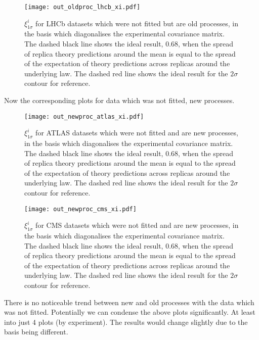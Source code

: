 \begin{figure}[ht]
    \centering
    \texttt{[image: out\_oldproc\_lhcb\_xi.pdf]}
    \caption{$\xi_{1\sigma}^{i}$ for LHCb datasets which were not fitted
    but are old processes, in the basis which diagonalises the experimental
    covariance matrix. The dashed black line shows the ideal result, 0.68, when
    the spread of replica theory predictions around the mean is equal to the
    spread of the expectation of theory predictions across replicas around the
    underlying law. The dashed red line shows the ideal result for the $2\sigma$
    contour for reference.}
    \label{fig:outoldlhcbxi}
\end{figure}

Now the corresponding plots for data which was not fitted, new processes.

\begin{figure}[ht]
    \centering
    \texttt{[image: out\_newproc\_atlas\_xi.pdf]}
    \caption{$\xi_{1\sigma}^{i}$ for ATLAS datasets which were not fitted
    and are new processes, in the basis which diagonalises the experimental
    covariance matrix. The dashed black line shows the ideal result, 0.68, when
    the spread of replica theory predictions around the mean is equal to the
    spread of the expectation of theory predictions across replicas around the
    underlying law. The dashed red line shows the ideal result for the $2\sigma$
    contour for reference.}
    \label{fig:outnewatlasxi}
\end{figure}

\begin{figure}[ht]
    \centering
    \texttt{[image: out\_newproc\_cms\_xi.pdf]}
    \caption{$\xi_{1\sigma}^{i}$ for CMS datasets which were not fitted
    and are new processes, in the basis which diagonalises the experimental
    covariance matrix. The dashed black line shows the ideal result, 0.68, when
    the spread of replica theory predictions around the mean is equal to the
    spread of the expectation of theory predictions across replicas around the
    underlying law. The dashed red line shows the ideal result for the $2\sigma$
    contour for reference.}
    \label{fig:outnewcmsxi}
\end{figure}

There is no noticeable trend between new and old processes with the data which
was not fitted. Potentially we can condense the above plots significantly. At
least into just 4 plots (by experiment). The results would change slightly
due to the basis being different.
